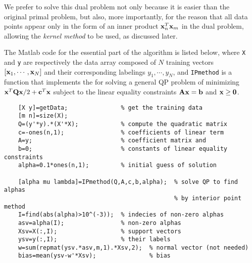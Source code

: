 \documentclass{article}
\begin{document}
We prefer to solve this dual problem not only because it is easier 
than the original primal problem, but also, more importantly, for 
the reason that all data points appear only in the form of an inner 
product $ {\bf x}_n^T{\bf x}_m$ in the dual problem, allowing the 
{\em kernel method} to be used, as discussed later. 


The Matlab code for the essential part of the algorithm is listed 
below, where \verb|X| and \verb|y| are respectively the data array 
composed of $N$ training vectors $[{\bf x}_1,\cdots,{\bf x}_N]$ and 
their corresponding labelings $y_1,\cdots,y_N$, and \verb|IPmethod|
is a function that implements the 
for solving a general QP problem of minimizing 
${\bf x}^T{\bf Qx}/2+{\bf c}^T{\bf x}$ subject to the linear 
equality constraints ${\bf Ax}={\bf b}$ and ${\bf x}\ge {\bf 0}$.

\begin{verbatim}
    [X y]=getData;               % get the training data
    [m n]=size(X);   
    Q=(y'*y).*(X'*X);            % compute the quadratic matrix
    c=-ones(n,1);                % coefficients of linear term
    A=y;                         % coefficient matrix and 
    b=0;                         % constants of linear equality constraints
    alpha=0.1*ones(n,1);         % initial guess of solution

    [alpha mu lambda]=IPmethod(Q,A,c,b,alpha);  % solve QP to find alphas
                                                % by interior point method
    I=find(abs(alpha)>10^(-3));  % indecies of non-zero alphas
    asv=alpha(I);                % non-zero alphas
    Xsv=X(:,I);                  % support vectors
    ysv=y(:,I);                  % their labels
    w=sum(repmat(ysv.*asv,m,1).*Xsv,2);  % normal vector (not needed)
    bias=mean(ysv-w'*Xsv);               % bias
\end{verbatim}
\end{document}
